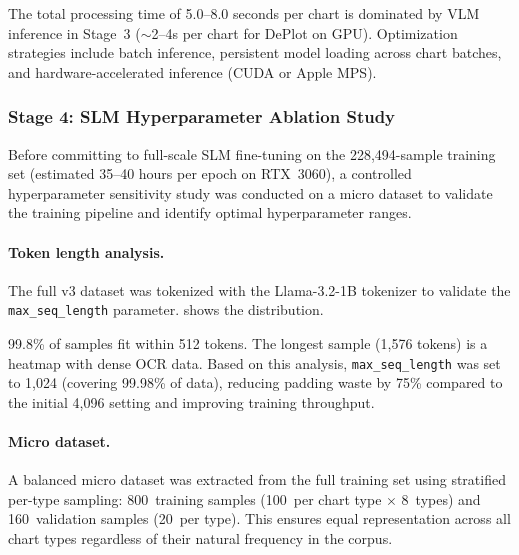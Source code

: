 The total processing time of 5.0--8.0 seconds per chart is dominated by VLM inference
in Stage~3 ($\sim$2--4s per chart for DePlot on GPU). Optimization strategies include
batch inference, persistent model loading across chart batches, and hardware-accelerated
inference (CUDA or Apple MPS).

\subsubsection{Stage 4: SLM Hyperparameter Ablation Study}
\label{sec:slm_ablation}

Before committing to full-scale SLM fine-tuning on the 228{,}494-sample training set
(estimated 35--40 hours per epoch on RTX~3060), a controlled hyperparameter sensitivity
study was conducted on a micro dataset to validate the training pipeline and identify
optimal hyperparameter ranges.

\paragraph{Token length analysis.}
The full v3 dataset was tokenized with the Llama-3.2-1B tokenizer to validate the
\texttt{max\_seq\_length} parameter.  shows the distribution.

\begin{table}[htbp]
\centering
\caption{Token length distribution of training conversations (228{,}494 samples,
    Llama-3.2-1B tokenizer). Mean = 224, median = 223, P99 = 412, max = 1{,}576.}
\label{tab:token_dist}

\end{table}

99.8\% of samples fit within 512 tokens. The longest sample (1{,}576 tokens) is a
heatmap with dense OCR data. Based on this analysis, \texttt{max\_seq\_length} was
set to 1{,}024 (covering 99.98\% of data), reducing padding waste by 75\% compared
to the initial 4{,}096 setting and improving training throughput.

\paragraph{Micro dataset.}
A balanced micro dataset was extracted from the full training set using stratified
per-type sampling: 800~training samples (100~per chart type $\times$ 8~types) and
160~validation samples (20~per type). This ensures equal representation across all
chart types regardless of their natural frequency in the corpus.

